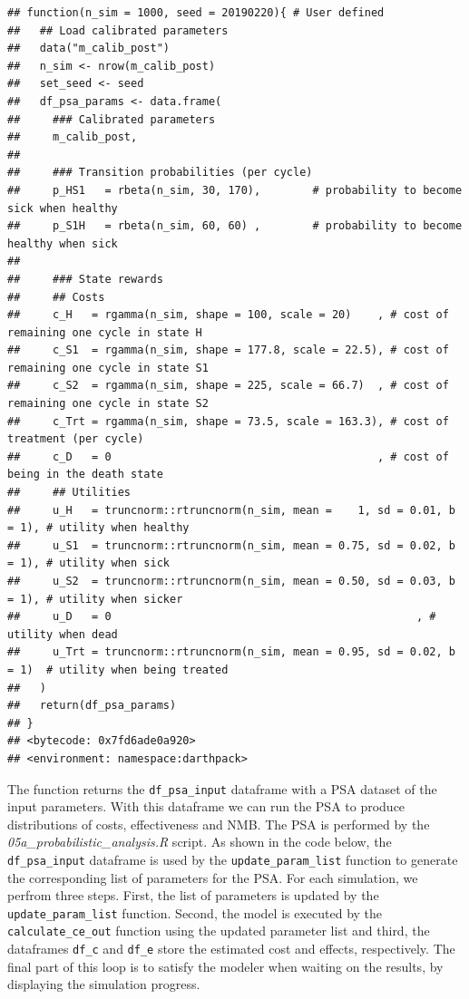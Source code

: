 \documentclass[]{book}
\begin{document}
\begin{verbatim}
## function(n_sim = 1000, seed = 20190220){ # User defined
##   ## Load calibrated parameters
##   data("m_calib_post")
##   n_sim <- nrow(m_calib_post)
##   set_seed <- seed
##   df_psa_params <- data.frame(
##     ### Calibrated parameters
##     m_calib_post,
##     
##     ### Transition probabilities (per cycle)
##     p_HS1   = rbeta(n_sim, 30, 170),        # probability to become sick when healthy
##     p_S1H   = rbeta(n_sim, 60, 60) ,        # probability to become healthy when sick
##     
##     ### State rewards
##     ## Costs
##     c_H   = rgamma(n_sim, shape = 100, scale = 20)    , # cost of remaining one cycle in state H
##     c_S1  = rgamma(n_sim, shape = 177.8, scale = 22.5), # cost of remaining one cycle in state S1
##     c_S2  = rgamma(n_sim, shape = 225, scale = 66.7)  , # cost of remaining one cycle in state S2
##     c_Trt = rgamma(n_sim, shape = 73.5, scale = 163.3), # cost of treatment (per cycle)
##     c_D   = 0                                         , # cost of being in the death state
##     ## Utilities
##     u_H   = truncnorm::rtruncnorm(n_sim, mean =    1, sd = 0.01, b = 1), # utility when healthy
##     u_S1  = truncnorm::rtruncnorm(n_sim, mean = 0.75, sd = 0.02, b = 1), # utility when sick
##     u_S2  = truncnorm::rtruncnorm(n_sim, mean = 0.50, sd = 0.03, b = 1), # utility when sicker
##     u_D   = 0                                               , # utility when dead
##     u_Trt = truncnorm::rtruncnorm(n_sim, mean = 0.95, sd = 0.02, b = 1)  # utility when being treated
##   )
##   return(df_psa_params)
## }
## <bytecode: 0x7fd6ade0a920>
## <environment: namespace:darthpack>
\end{verbatim}

The function returns the \texttt{df\_psa\_input} dataframe with a PSA
dataset of the input parameters. With this dataframe we can run the PSA
to produce distributions of costs, effectiveness and NMB. The PSA is
performed by the \emph{05a\_probabilistic\_analysis.R} script. As shown
in the code below, the \texttt{df\_psa\_input} dataframe is used by the
\texttt{update\_param\_list} function to generate the corresponding list
of parameters for the PSA. For each simulation, we perfrom three steps.
First, the list of parameters is updated by the
\texttt{update\_param\_list} function. Second, the model is executed by
the \texttt{calculate\_ce\_out} function using the updated parameter
list and third, the dataframes \texttt{df\_c} and \texttt{df\_e} store
the estimated cost and effects, respectively. The final part of this
loop is to satisfy the modeler when waiting on the results, by
displaying the simulation progress.
\end{document}
